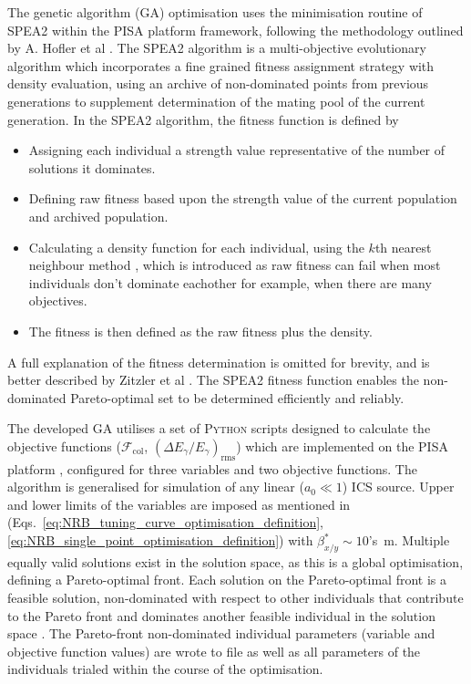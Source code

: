 \documentclass[../main.tex]{subfiles}
\begin{document}
The genetic algorithm (GA) optimisation uses the minimisation routine of \textsc{SPEA2} \cite{zitzler2001spea2} within the \textsc{PISA} platform \cite{bleuler2003pisa} framework, following the methodology outlined by A. Hofler et al \cite{hofler2013innovative}. The \textsc{SPEA2} algorithm is a multi-objective evolutionary algorithm which incorporates a fine grained fitness assignment strategy \cite{zitzler2001spea2} with density evaluation, using an archive of non-dominated points from previous generations to supplement determination of the mating pool of the current generation. In the \textsc{SPEA2} algorithm, the fitness function is defined by
\begin{itemize}
    \item{Assigning each individual a strength value representative of the number of solutions it dominates.}
    \item{Defining raw fitness based upon the strength value of the current population and archived population.}
    \item{Calculating a density function for each individual, using the $k$th nearest neighbour method \cite{silverman1986density}, which is introduced as raw fitness can fail when most individuals don't dominate eachother for example, when there are many objectives.}
    \item{The fitness is then defined as the raw fitness plus the density.}
\end{itemize}
A full explanation of the fitness determination is omitted for brevity, and is better described by Zitzler et al \cite{zitzler2001spea2}. The \textsc{SPEA2} fitness function enables the non-dominated Pareto-optimal set to be determined efficiently and reliably.

The developed GA utilises a set of \textsc{Python} scripts designed to calculate the objective functions ($\mathcal{F}_{\mathrm{col}}$, $\left(\Delta E_{\gamma}/E_{\gamma}\right)_{\mathrm{rms}}$) which are implemented on the \textsc{PISA} platform \cite{bleuler2003pisa}, configured for three variables and two objective functions. The algorithm is generalised for simulation of any linear ($a_{0} \ll 1$) ICS source. Upper and lower limits of the variables are imposed as mentioned in (Eqs.~\ref{eq:NRB_tuning_curve_optimisation_definition}, \ref{eq:NRB_single_point_optimisation_definition}) with  $\beta_{x/y}^{*}\sim 10$'s~\si{\meter}. Multiple equally valid solutions exist in the solution space, as this is a global optimisation, defining a Pareto-optimal front. Each solution on the Pareto-optimal front is a feasible solution, non-dominated with respect to other individuals that contribute to the Pareto front and dominates another feasible individual in the solution space \cite{hofler2013innovative}. The Pareto-front non-dominated individual parameters (variable and objective function values) are wrote to file as well as all parameters of the individuals trialed within the course of the optimisation.  
\end{document}
